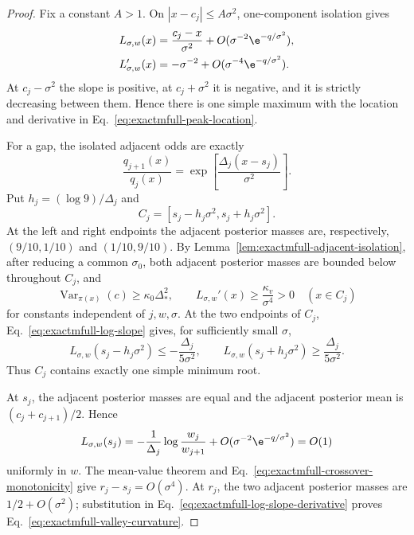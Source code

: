 \begin{proof}
Fix a constant \(A>1\).  On
\(|x-c_j|\le A\sigma^2\), one-component isolation gives
\begin{align}
 L_{\sigma,w}(x)
 &=\frac{c_j-x}{\sigma^2}
   +O(\sigma^{-2}\e^{-q/\sigma^2}),
 \label{eq:exactmfull-peak-slope-expansion}\\
 L_{\sigma,w}'(x)
 &=-\sigma^{-2}
   +O(\sigma^{-4}\e^{-q/\sigma^2}).
 \label{eq:exactmfull-peak-derivative-expansion}
\end{align}
At \(c_j-\sigma^2\) the slope is positive, at
\(c_j+\sigma^2\) it is negative, and it is strictly decreasing between
them.  Hence there is one simple maximum with the location and derivative in
Eq.~\eqref{eq:exactmfull-peak-location}.

For a gap, the isolated adjacent odds are exactly
\begin{equation}
 \frac{q_{j+1}(x)}{q_j(x)}
 =\exp\!\left[\frac{\Delta_j(x-s_j)}{\sigma^2}\right].
 \label{eq:exactmfull-adjacent-odds}
\end{equation}
Put \(h_j=(\log9)/\Delta_j\) and
\begin{equation}
 C_j=[s_j-h_j\sigma^2,s_j+h_j\sigma^2].
 \label{eq:exactmfull-crossover-interval}
\end{equation}
At the left and right endpoints the adjacent posterior masses are,
respectively, \((9/10,1/10)\) and \((1/10,9/10)\).  By
Lemma~\ref{lem:exactmfull-adjacent-isolation}, after reducing a common
\(\sigma_0\), both adjacent posterior masses are bounded below throughout
\(C_j\), and
\begin{equation}
 \operatorname{Var}_{\pi(x)}(c)\ge\kappa_0\Delta_*^2,
 \qquad
 L_{\sigma,w}'(x)\ge\frac{\kappa_v}{\sigma^4}>0
 \quad(x\in C_j)
 \label{eq:exactmfull-crossover-monotonicity}
\end{equation}
for constants independent of \(j,w,\sigma\).  At the two endpoints of
\(C_j\), Eq.~\eqref{eq:exactmfull-log-slope} gives, for sufficiently small
\(\sigma\),
\begin{equation}
 L_{\sigma,w}(s_j-h_j\sigma^2)
 \le-\frac{\Delta_j}{5\sigma^2},
 \qquad
 L_{\sigma,w}(s_j+h_j\sigma^2)
 \ge \frac{\Delta_j}{5\sigma^2}.
 \label{eq:exactmfull-crossover-signs}
\end{equation}
Thus \(C_j\) contains exactly one simple minimum root.

At \(s_j\), the adjacent posterior masses are equal and the adjacent
posterior mean is \((c_j+c_{j+1})/2\).  Hence
\begin{equation}
 L_{\sigma,w}(s_j)
 =-\frac{1}{\Delta_j}\log\frac{w_j}{w_{j+1}}
 +O(\sigma^{-2}\e^{-q/\sigma^2})=O(1)
 \label{eq:exactmfull-slope-at-crossover}
\end{equation}
uniformly in \(w\).  The mean-value theorem and
Eq.~\eqref{eq:exactmfull-crossover-monotonicity} give
\(r_j-s_j=O(\sigma^4)\).  At \(r_j\), the two adjacent posterior masses are
\(1/2+O(\sigma^2)\); substitution in
Eq.~\eqref{eq:exactmfull-log-slope-derivative} proves
Eq.~\eqref{eq:exactmfull-valley-curvature}.


\end{proof}
